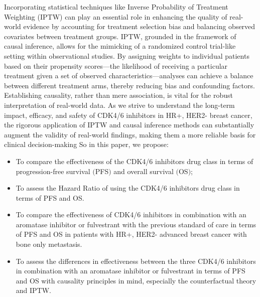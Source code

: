 Incorporating statistical techniques like Inverse Probability of Treatment Weighting (IPTW) can play an essential role in enhancing the quality of real-world evidence by accounting for treatment selection bias and balancing observed covariates between treatment groups. IPTW, grounded in the framework of causal inference, allows for the mimicking of a randomized control trial-like setting within observational studies. By assigning weights to individual patients based on their propensity scores—the likelihood of receiving a particular treatment given a set of observed characteristics—analyses can achieve a balance between different treatment arms, thereby reducing bias and confounding factors. Establishing causality, rather than mere association, is vital for the robust interpretation of real-world data. As we strive to understand the long-term impact, efficacy, and safety of CDK4/6 inhibitors in HR+, HER2- breast cancer, the rigorous application of IPTW and causal inference methods can substantially augment the validity of real-world findings, making them a more reliable basis for clinical decision-making \cite{austinIntroductionPropensityScore2011,austinUsePropensityScore2014}
So in this paper, we propose:
\begin{itemize}
    \item To compare the effectiveness of the CDK4/6 inhibitors drug class in terms of progression-free survival $($PFS$)$ and overall survival $($OS$)$;
\item To assess the Hazard Ratio of using the CDK4/6 inhibitors drug class in terms of PFS and OS.
    \item To compare the effectiveness of CDK4/6 inhibitors in combination with an aromatase inhibitor or fulvestrant with the previous standard of care in terms of PFS and OS in patients with HR+, HER2- advanced breast cancer with bone only metastasis.
    \item  To assess the differences in effectiveness between the three CDK4/6 inhibitors in combination with an aromatase inhibitor or fulvestrant in terms of PFS and OS with causality principles in mind, especially the counterfactual theory and IPTW.
\end{itemize}

